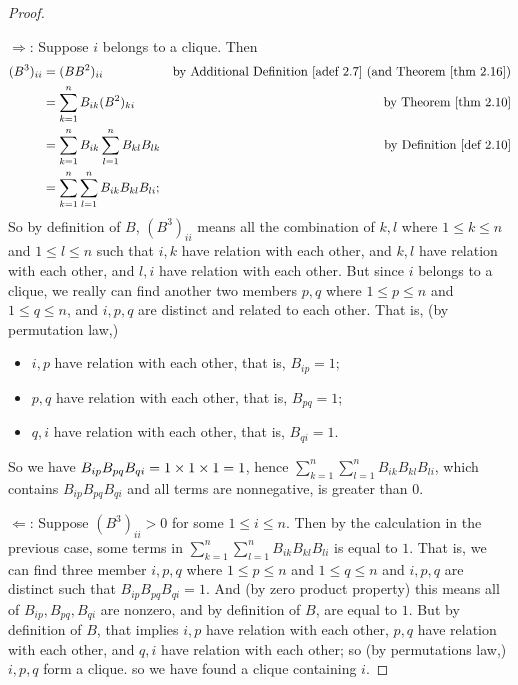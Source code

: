 \begin{proof} \ 

\(\Longrightarrow\): Suppose \(i\) belongs to a clique.
Then
\begin{align*}
    (B^3)_{ii} & = (BB^2)_{ii} & \text{by \ADEF{2.7} (and \THM{2.16})}\\
               & = \sum_{k = 1}^n B_{ik} (B^2)_{ki} & \text{by \THM{2.10}} \\
               & = \sum_{k = 1}^n B_{ik} \sum_{l = 1}^n B_{kl} B_{lk} & \text{by \DEF{2.10}} \\
               & = \sum_{k = 1}^n \sum_{l = 1}^n B_{ik} B_{kl} B_{li};
\end{align*}
So by definition of \(B\), \((B^3)_{ii}\) means all the combination of \(k, l\) where \(1 \le k \le n\) and \(1 \le l \le n\) such that \(i, k\) have relation with each other, and \(k, l\) have relation with each other, and \(l, i\) have relation with each other.
But since \(i\) belongs to a clique, we really can find another two members \(p, q\) where \(1 \le p \le n\) and \(1 \le q \le n\), and \(i, p, q\) are distinct and related to each other.
That is, (by permutation law,)
\begin{itemize}
    \item \(i, p\) have relation with each other, that is, \(B_{ip} = 1\);
    \item \(p, q\) have relation with each other, that is, \(B_{pq} = 1\);
    \item \(q, i\) have relation with each other, that is, \(B_{qi} = 1\).
\end{itemize}
So we have \(B_{ip} B_{pq} B_{qi} = 1 \times 1 \times 1 = 1\), hence \(\sum_{k = 1}^n \sum_{l = 1}^n B_{ik} B_{kl} B_{li}\), which contains \(B_{ip} B_{pq} B_{qi}\) and all terms are nonnegative, is greater than \(0\).

\(\Longleftarrow\): Suppose \((B^3)_{ii} > 0\) for some \(1 \le i \le n\).
Then by the calculation in the previous case, some terms in \(\sum_{k = 1}^n \sum_{l = 1}^n B_{ik} B_{kl} B_{li}\) is equal to \(1\).
That is, we can find three member \(i, p, q\) where \(1 \le p \le n\) and \(1 \le q \le n\) and \(i, p, q\) are distinct such that \(B_{ip} B_{pq} B_{qi} = 1\).
And (by zero product property) this means all of \(B_{ip}, B_{pq}, B_{qi}\) are nonzero, and by definition of \(B\), are equal to \(1\).
But by definition of \(B\), that implies \(i, p\) have relation with each other, \(p, q\) have relation with each other, and \(q, i\) have relation with each other;
so (by permutations law,) \(i, p, q\) form a clique.
so we have found a clique containing \(i\).
\end{proof}

